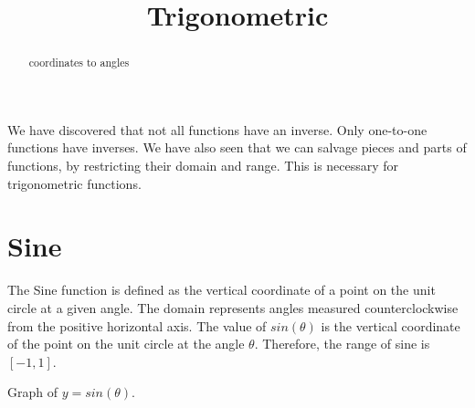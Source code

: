 \documentclass{ximera}
\title{Trigonometric}
\begin{document}
\begin{abstract}
coordinates to angles
\end{abstract}
\maketitle



We have discovered that not all functions have an inverse.  Only one-to-one functions have inverses.  We have also seen that we can salvage pieces and parts of functions, by restricting their domain and range.  This is necessary for trigonometric functions.





\section{Sine}

The Sine function is defined as the vertical coordinate of a point on the unit circle at a given angle.  The domain represents angles measured counterclockwise from the positive horizontal axis. The value of $sin(\theta)$ is the vertical coordinate of the point on the unit circle at the angle $\theta$. Therefore, the range of sine is $[-1, 1]$.


Graph of $y = sin(\theta)$.

\begin{image}
\end{image}
\end{document}
